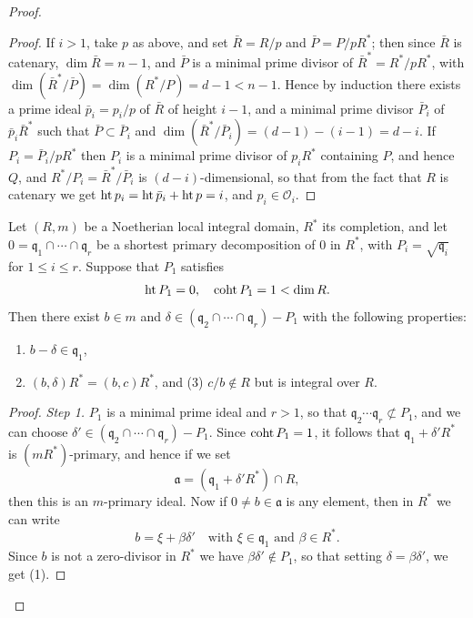 \begin{proof}
\begin{proof}
If $i > 1$, take $p$ as above, and set $\bar{R} = R/p$ and $\bar{P} = P/pR^*$; then since
$\bar{R}$ is catenary, $\dim \bar{R} = n - 1$, and $\bar{P}$ is a minimal prime divisor of
$\bar{R}^* = R^*/pR^*$, with $\dim(\bar{R}^*/\bar{P}) = \dim(R^*/P) = d - 1 < n - 1$. Hence by
induction there exists a prime ideal $\bar{p}_i = p_i/p$ of $\bar{R}$ of height $i - 1$, and
a minimal prime divisor $\bar{P}_i$ of $\bar{p}_i\bar{R}^*$ such that $\bar{P} \subset \bar{P}_i$ and
$\dim(\bar{R}^*/\bar{P}_i) = (d - 1) - (i - 1) = d - i$. If $P_i = \bar{P}_i/pR^*$ then $P_i$ is a minimal
prime divisor of $p_iR^*$ containing $P$, and hence $Q$, and $R^*/P_i = \bar{R}^*/\bar{P}_i$ is
$(d - i)$-dimensional, so that from the fact that $R$ is catenary we get
$\operatorname{ht} p_i = \operatorname{ht} \bar{p}_i + \operatorname{ht} p = i$, and $p_i \in \mathcal{O}_i$.
\end{proof}

\begin{lemma}\label{lem:31.4}
Let $(R, m)$ be a Noetherian local integral domain, $R^*$ its completion, and let
$0 = \mathfrak{q}_1 \cap \cdots \cap \mathfrak{q}_r$ be a shortest primary decomposition of $0$ in $R^*$, with
$P_i = \sqrt{\mathfrak{q}_i}$ for $1 \le i \le r$. Suppose that $P_1$ satisfies
\[
  \operatorname{ht} P_1 = 0, \quad \operatorname{coht} P_1 = 1 < \dim R.
\]
Then there exist $b \in m$ and $\delta \in (\mathfrak{q}_2 \cap \cdots \cap \mathfrak{q}_r) - P_1$ with the
following properties:
\begin{enumerate}[(1)]
  \item $b - \delta \in \mathfrak{q}_1$,
  \item $(b, \delta)R^* = (b, c)R^*$,
and (3) $c/b \notin R$ but is integral over $R$.
\end{enumerate}
\end{lemma}

\begin{proof}
\textit{Step 1.} $P_1$ is a minimal prime ideal and $r > 1$, so that
$\mathfrak{q}_2 \cdots \mathfrak{q}_r \not\subset P_1$, and we can choose
$\delta' \in (\mathfrak{q}_2 \cap \cdots \cap \mathfrak{q}_r) - P_1$. Since $\operatorname{coht} P_1 = 1$, it follows that
$\mathfrak{q}_1 + \delta'R^*$ is $(mR^*)$-primary, and hence if we set
\[
  \mathfrak{a} = (\mathfrak{q}_1 + \delta'R^*) \cap R,
\]
then this is an $m$-primary ideal. Now if $0 \ne b \in \mathfrak{a}$ is any element, then in
$R^*$ we can write
\[
  b = \xi + \beta\delta' \quad \text{with } \xi \in \mathfrak{q}_1 \text{ and } \beta \in R^*.
\]
Since $b$ is not a zero-divisor in $R^*$ we have $\beta\delta' \notin P_1$, so that setting
$\delta = \beta\delta'$, we get (1).


\end{proof}
\end{proof}
